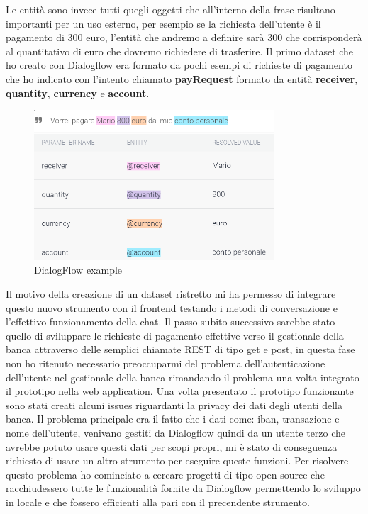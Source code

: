 Le entità sono invece tutti quegli oggetti che all'interno della frase risultano importanti per un uso esterno, per esempio se la richiesta dell'utente è il pagamento di 300 euro, l'entità che andremo a definire sarà 300 che corrisponderà al quantitativo di euro che dovremo richiedere di trasferire.
Il primo dataset che ho creato con Dialogflow era formato da pochi esempi di richieste di pagamento che ho indicato con l'intento chiamato \textbf{payRequest} formato da entità \textbf{receiver}, \textbf{quantity}, \textbf{currency} e \textbf{account}.
\begin{figure}[H]
 \centering
  \includegraphics[width=0.8\textwidth]{img/nludatasetexample.png}
 \caption{DialogFlow example}
\end{figure}
Il motivo della creazione di un dataset ristretto mi ha permesso di integrare questo nuovo strumento con il frontend testando i metodi di conversazione e l'effettivo funzionamento della chat.
Il passo subito successivo sarebbe stato quello di sviluppare le richieste di pagamento effettive verso il gestionale della banca attraverso delle semplici chiamate REST di tipo get e post, in questa fase non ho ritenuto necessario preoccuparmi del problema dell'autenticazione dell'utente nel gestionale della banca rimandando il problema una volta integrato il prototipo nella web application.
Una volta presentato il prototipo funzionante sono stati creati alcuni issues riguardanti la privacy dei dati degli utenti della banca.
Il problema principale era il fatto che i dati come: iban, transazione e nome dell'utente, venivano gestiti da Dialogflow quindi da un utente terzo che avrebbe potuto usare questi dati per scopi propri, mi è stato di conseguenza richiesto di usare un altro strumento per eseguire queste funzioni.
Per risolvere questo problema ho cominciato a cercare progetti di tipo open source che racchiudessero tutte le funzionalità fornite da Dialogflow permettendo lo sviluppo in locale e che fossero efficienti alla pari con il precendente strumento.
